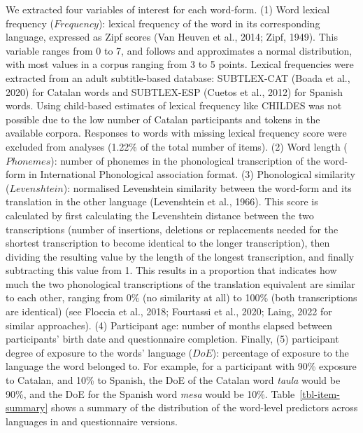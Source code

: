\documentclass[
  letterpaper,
  DIV=11,
  numbers=noendperiod]{scrartcl}
\begin{document}
We extracted four variables of interest for each word-form. (1) Word
lexical frequency (\(Frequency\)): lexical frequency of the word in its
corresponding language, expressed as Zipf scores (Van Heuven et al.,
2014; Zipf, 1949). This variable ranges from 0 to 7, and follows and
approximates a normal distribution, with most values in a corpus ranging
from 3 to 5 points. Lexical frequencies were extracted from an adult
subtitle-based database: SUBTLEX-CAT (Boada et al., 2020) for Catalan
words and SUBTLEX-ESP (Cuetos et al., 2012) for Spanish words. Using
child-based estimates of lexical frequency like CHILDES was not possible
due to the low number of Catalan participants and tokens in the
available corpora. Responses to words with missing lexical frequency
score were excluded from analyses (1.22\% of the total number of items).
(2) Word length (\(Phonemes\)): number of phonemes in the phonological
transcription of the word-form in International Phonological association
format. (3) Phonological similarity (\(Levenshtein\)): normalised
Levenshtein similarity between the word-form and its translation in the
other language (Levenshtein et al., 1966). This score is calculated by
first calculating the Levenshtein distance between the two
transcriptions (number of insertions, deletions or replacements needed
for the shortest transcription to become identical to the longer
transcription), then dividing the resulting value by the length of the
longest transcription, and finally subtracting this value from 1. This
results in a proportion that indicates how much the two phonological
transcriptions of the translation equivalent are similar to each other,
ranging from 0\% (no similarity at all) to 100\% (both transcriptions
are identical) (see Floccia et al., 2018; Fourtassi et al., 2020; Laing,
2022 for similar approaches). (4) Participant age: number of months
elapsed between participants' birth date and questionnaire completion.
Finally, (5) participant degree of exposure to the words' language
(\(DoE\)): percentage of exposure to the language the word belonged to.
For example, for a participant with 90\% exposure to Catalan, and 10\%
to Spanish, the DoE of the Catalan word \emph{taula} would be 90\%, and
the DoE for the Spanish word \emph{mesa} would be 10\%.
Table~\ref{tbl-item-summary} shows a summary of the distribution of the
word-level predictors across languages in and questionnaire versions.
\end{document}
